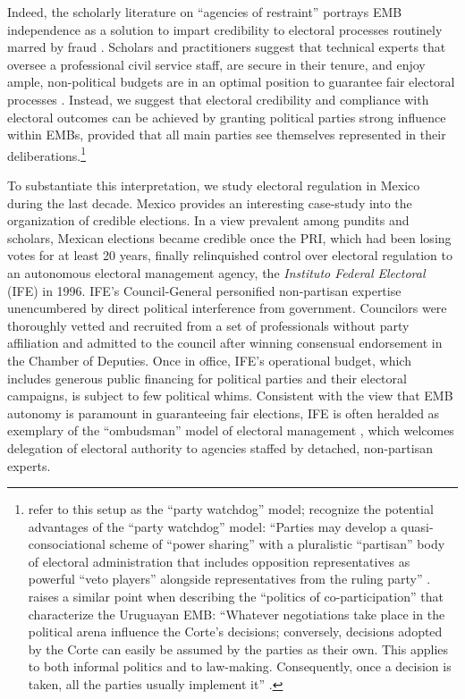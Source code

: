 \documentclass[12 pt, letter]{article}
\begin{document}
Indeed, the scholarly literature on ``agencies of restraint''
portrays EMB independence as a solution to impart credibility to
electoral processes routinely marred by fraud \citep{Schedler1999,
Hartlyn2007}.  Scholars and practitioners suggest that technical
experts that oversee a professional civil service staff, are secure
in their tenure, and enjoy ample, non-political budgets are in an
optimal position to guarantee fair electoral processes \citep[cf.
references in][]{LopezPintor2000, Mozaffar2002}.   Instead, we
suggest that electoral credibility and compliance with electoral
outcomes can be achieved by granting political parties strong
influence within EMBs, provided that all main parties see themselves
represented in their deliberations.\footnote{\citet{Molina1999}
refer to this setup as the ``party watchdog'' model;
\citeauthor{Mozaffar2002a} recognize the potential advantages of the
``party watchdog'' model: ``Parties may develop a
quasi-consociational scheme of ``power sharing'' with a pluralistic
``partisan'' body of electoral administration that includes
opposition representatives as powerful ``veto players'' alongside
representatives from the ruling party'' \citep[p.
16]{Mozaffar2002a}.  \citeauthor{LopezPintor2000} raises a similar
point when describing the ``politics of co-participation'' that
characterize the Uruguayan EMB: ``Whatever negotiations take place
in the political arena influence the Corte's decisions; conversely,
decisions adopted by the Corte can easily be assumed by the parties
as their own. This applies to both informal politics and to
law-making. Consequently, once a decision is taken, all the parties
usually implement it'' \citep[p. 23]{LopezPintor2000}.}

To substantiate this interpretation, we study electoral regulation in Mexico during the last decade.  Mexico provides an interesting case-study into the organization of credible elections.  In a view prevalent among pundits and scholars, Mexican elections became credible once the PRI, which had been losing votes for at least 20 years, finally relinquished control over electoral regulation to an autonomous electoral management agency, the \emph{Instituto Federal Electoral} (IFE) in 1996.   IFE's Council-General personified non-partisan expertise unencumbered by direct political interference from government.  Councilors were thoroughly vetted and recruited from a set of professionals without party affiliation and admitted to the council after winning consensual endorsement in the Chamber of Deputies.  Once in office, IFE's operational budget, which includes generous public financing for political parties and their electoral campaigns, is subject to few political whims.  Consistent with the view that EMB autonomy is paramount in guaranteeing fair elections, IFE is often heralded as exemplary of the ``ombudsman'' model of electoral management \citep{Eisenstadt2004}, which welcomes delegation of electoral authority to agencies staffed by detached, non-partisan experts.
\end{document}
